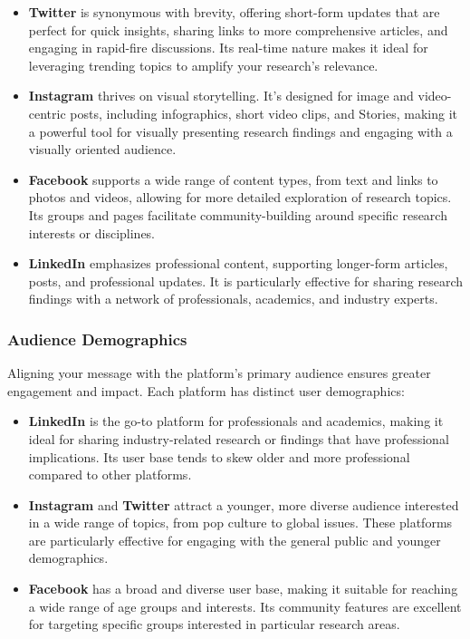 \documentclass[
]{book}
\providecommand{\tightlist}{%
  \setlength{\itemsep}{0pt}\setlength{\parskip}{0pt}}
\begin{document}
\begin{itemize}
\tightlist
\item
  \textbf{Twitter} is synonymous with brevity, offering short-form updates that are perfect for quick insights, sharing links to more comprehensive articles, and engaging in rapid-fire discussions. Its real-time nature makes it ideal for leveraging trending topics to amplify your research's relevance.
\item
  \textbf{Instagram} thrives on visual storytelling. It's designed for image and video-centric posts, including infographics, short video clips, and Stories, making it a powerful tool for visually presenting research findings and engaging with a visually oriented audience.
\item
  \textbf{Facebook} supports a wide range of content types, from text and links to photos and videos, allowing for more detailed exploration of research topics. Its groups and pages facilitate community-building around specific research interests or disciplines.
\item
  \textbf{LinkedIn} emphasizes professional content, supporting longer-form articles, posts, and professional updates. It is particularly effective for sharing research findings with a network of professionals, academics, and industry experts.
\end{itemize}

\hypertarget{audience-demographics}{%
\subsubsection{Audience Demographics}\label{audience-demographics}}

Aligning your message with the platform's primary audience ensures greater engagement and impact. Each platform has distinct user demographics:

\begin{itemize}
\tightlist
\item
  \textbf{LinkedIn} is the go-to platform for professionals and academics, making it ideal for sharing industry-related research or findings that have professional implications. Its user base tends to skew older and more professional compared to other platforms.
\item
  \textbf{Instagram} and \textbf{Twitter} attract a younger, more diverse audience interested in a wide range of topics, from pop culture to global issues. These platforms are particularly effective for engaging with the general public and younger demographics.
\item
  \textbf{Facebook} has a broad and diverse user base, making it suitable for reaching a wide range of age groups and interests. Its community features are excellent for targeting specific groups interested in particular research areas.
\end{itemize}
\end{document}
